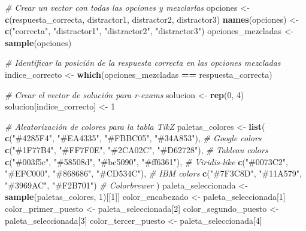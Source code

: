 \documentclass[
]{article}
\newenvironment{Shaded}{\begin{snugshade}}{\end{snugshade}}
\newcommand{\CommentTok}[1]{\textcolor[rgb]{0.56,0.35,0.01}{\textit{#1}}}
\newcommand{\DecValTok}[1]{\textcolor[rgb]{0.00,0.00,0.81}{#1}}
\newcommand{\FunctionTok}[1]{\textcolor[rgb]{0.13,0.29,0.53}{\textbf{#1}}}
\newcommand{\NormalTok}[1]{#1}
\newcommand{\OtherTok}[1]{\textcolor[rgb]{0.56,0.35,0.01}{#1}}
\newcommand{\SpecialCharTok}[1]{\textcolor[rgb]{0.81,0.36,0.00}{\textbf{#1}}}
\newcommand{\StringTok}[1]{\textcolor[rgb]{0.31,0.60,0.02}{#1}}
\begin{document}
\begin{Shaded}
\begin{Highlighting}[]
\CommentTok{\# Crear un vector con todas las opciones y mezclarlas}
\NormalTok{opciones }\OtherTok{\textless{}{-}} \FunctionTok{c}\NormalTok{(respuesta\_correcta, distractor1, distractor2, distractor3)}
\FunctionTok{names}\NormalTok{(opciones) }\OtherTok{\textless{}{-}} \FunctionTok{c}\NormalTok{(}\StringTok{"correcta"}\NormalTok{, }\StringTok{"distractor1"}\NormalTok{, }\StringTok{"distractor2"}\NormalTok{, }\StringTok{"distractor3"}\NormalTok{)}
\NormalTok{opciones\_mezcladas }\OtherTok{\textless{}{-}} \FunctionTok{sample}\NormalTok{(opciones)}

\CommentTok{\# Identificar la posición de la respuesta correcta en las opciones mezcladas}
\NormalTok{indice\_correcto }\OtherTok{\textless{}{-}} \FunctionTok{which}\NormalTok{(opciones\_mezcladas }\SpecialCharTok{==}\NormalTok{ respuesta\_correcta)}

\CommentTok{\# Crear el vector de solución para r{-}exams}
\NormalTok{solucion }\OtherTok{\textless{}{-}} \FunctionTok{rep}\NormalTok{(}\DecValTok{0}\NormalTok{, }\DecValTok{4}\NormalTok{)}
\NormalTok{solucion[indice\_correcto] }\OtherTok{\textless{}{-}} \DecValTok{1}

\CommentTok{\# Aleatorización de colores para la tabla TikZ}
\NormalTok{paletas\_colores }\OtherTok{\textless{}{-}} \FunctionTok{list}\NormalTok{(}
  \FunctionTok{c}\NormalTok{(}\StringTok{"\#4285F4"}\NormalTok{, }\StringTok{"\#EA4335"}\NormalTok{, }\StringTok{"\#FBBC05"}\NormalTok{, }\StringTok{"\#34A853"}\NormalTok{),  }\CommentTok{\# Google colors}
  \FunctionTok{c}\NormalTok{(}\StringTok{"\#1F77B4"}\NormalTok{, }\StringTok{"\#FF7F0E"}\NormalTok{, }\StringTok{"\#2CA02C"}\NormalTok{, }\StringTok{"\#D62728"}\NormalTok{),  }\CommentTok{\# Tableau colors}
  \FunctionTok{c}\NormalTok{(}\StringTok{"\#003f5c"}\NormalTok{, }\StringTok{"\#58508d"}\NormalTok{, }\StringTok{"\#bc5090"}\NormalTok{, }\StringTok{"\#ff6361"}\NormalTok{),  }\CommentTok{\# Viridis{-}like}
  \FunctionTok{c}\NormalTok{(}\StringTok{"\#0073C2"}\NormalTok{, }\StringTok{"\#EFC000"}\NormalTok{, }\StringTok{"\#868686"}\NormalTok{, }\StringTok{"\#CD534C"}\NormalTok{),  }\CommentTok{\# IBM colors}
  \FunctionTok{c}\NormalTok{(}\StringTok{"\#7F3C8D"}\NormalTok{, }\StringTok{"\#11A579"}\NormalTok{, }\StringTok{"\#3969AC"}\NormalTok{, }\StringTok{"\#F2B701"}\NormalTok{)   }\CommentTok{\# Colorbrewer}
\NormalTok{)}
\NormalTok{paleta\_seleccionada }\OtherTok{\textless{}{-}} \FunctionTok{sample}\NormalTok{(paletas\_colores, }\DecValTok{1}\NormalTok{)[[}\DecValTok{1}\NormalTok{]]}
\NormalTok{color\_encabezado }\OtherTok{\textless{}{-}}\NormalTok{ paleta\_seleccionada[}\DecValTok{1}\NormalTok{]}
\NormalTok{color\_primer\_puesto }\OtherTok{\textless{}{-}}\NormalTok{ paleta\_seleccionada[}\DecValTok{2}\NormalTok{]}
\NormalTok{color\_segundo\_puesto }\OtherTok{\textless{}{-}}\NormalTok{ paleta\_seleccionada[}\DecValTok{3}\NormalTok{]}
\NormalTok{color\_tercer\_puesto }\OtherTok{\textless{}{-}}\NormalTok{ paleta\_seleccionada[}\DecValTok{4}\NormalTok{]}
\end{Highlighting}
\end{Shaded}
\end{document}

